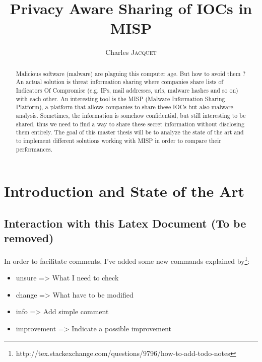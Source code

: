 \documentclass{eplmastersthesis}
\title{Privacy Aware Sharing of IOCs in MISP}	%
\author{Charles \textsc{Jacquet}}	%
\begin{document}
\maketitle					%
\thispagestyle{empty}		%


\begin{abstract} 
Malicious software (malware) are plaguing this computer age. But how to avoid them ?
An actual solution is threat information sharing where companies share lists of Indicators Of Compromise (e.g. IPs, mail addresses, urls, malware hashes and so on) with each other.
An interesting tool is the MISP (Malware Information Sharing Platform), a platform that allows companies to share these IOCs but also malware analysis.
Sometimes, the information is somehow confidential, but still interesting to be shared, thus we need to find a way to share these secret information without disclosing them entirely.
The goal of this master thesis will be to analyze the state of the art and to implement different solutions working with MISP in order to compare their performances.
\end{abstract}

\tableofcontents

\chapter{Introduction and State of the Art}
\section{Interaction with this Latex Document (To be removed)}
In order to facilitate comments, I've added some new commands explained by\footnote{http://tex.stackexchange.com/questions/9796/how-to-add-todo-notes}:\\
\begin{itemize}
\item unsure => What I need to check
\item change => What have to be modified
\item info => Add simple comment
\item improvement => Indicate a possible improvement
\end{itemize}
\end{document}

